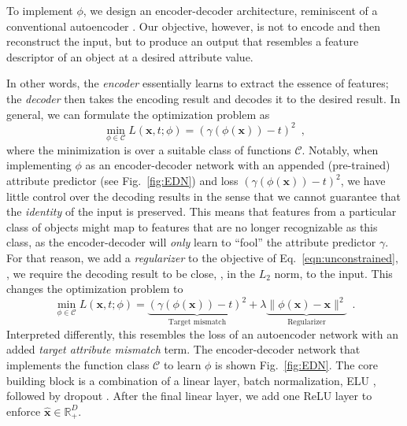 \documentclass[10pt,twocolumn,letterpaper]{article}
\begin{document}
To implement $\phi$, we design an encoder-decoder
architecture, reminiscent of a conventional autoencoder \cite{Bengio09a}.
Our objective, however, is not to encode and then reconstruct 
the input, but to produce an output that 
resembles a feature descriptor of an object at a 
desired attribute value.

In other words, the \emph{encoder} essentially learns to extract
the essence of features; the \emph{decoder}
then takes the encoding result and decodes it to the desired result. In
general, we can formulate the optimization problem as
\begin{equation}
\min_{\phi \in \mathcal{C}} L(\mathbf{x},t; \phi) = (\gamma(\phi(\mathbf{x}))-t)^2\enspace,
\label{eqn:unconstrained}
\end{equation}
where the minimization is 
over a suitable class of functions $\mathcal{C}$. Notably, when 
implementing $\phi$ as an encoder-decoder network with an 
appended (pre-trained) attribute predictor (see Fig.~\ref{fig:EDN})
and loss $(\gamma(\phi(\mathbf{x}))-t)^2$, we have little control 
over the decoding results in the sense that we cannot guarantee 
that the \emph{identity} of the input is preserved. This means
that features from a particular class of objects might map to 
features that are no longer recognizable as
this class, as the encoder-decoder will \emph{only} learn to ``fool'' the 
attribute predictor $\gamma$.
For that reason, we add a \emph{regularizer} to the objective
of Eq.~\eqref{eqn:unconstrained}, \ie, we require the 
decoding result to be close, \eg, in the $L_2$ norm, to the
input. This changes the optimization problem to
\begin{equation}
\min_{\phi \in \mathcal{C}} L(\mathbf{x},t; \phi) = \underbrace{(\gamma(\phi(\mathbf{x}))-t)^2}_\text{Target mismatch} + 
\lambda \underbrace{\| \phi(\mathbf{x}) - \mathbf{x} \|^2}_{\text{Regularizer}}
\enspace.
\label{eqn:constrained}
\end{equation}
Interpreted differently, this resembles the loss of an autoencoder 
network with an added \emph{target attribute mismatch} term. 
The encoder-decoder network that implements the function class $\mathcal{C}$ 
to learn $\phi$ is shown Fig.~\ref{fig:EDN}. 
The core building block is a combination of a linear layer, 
batch normalization, ELU \cite{Clevert16a}, followed by dropout 
\cite{Srivastava14a}. After the final linear
layer, we add one ReLU layer to enforce $\hat{\mathbf{x}} \in \mathbb{R}^D_+$.
\end{document}
